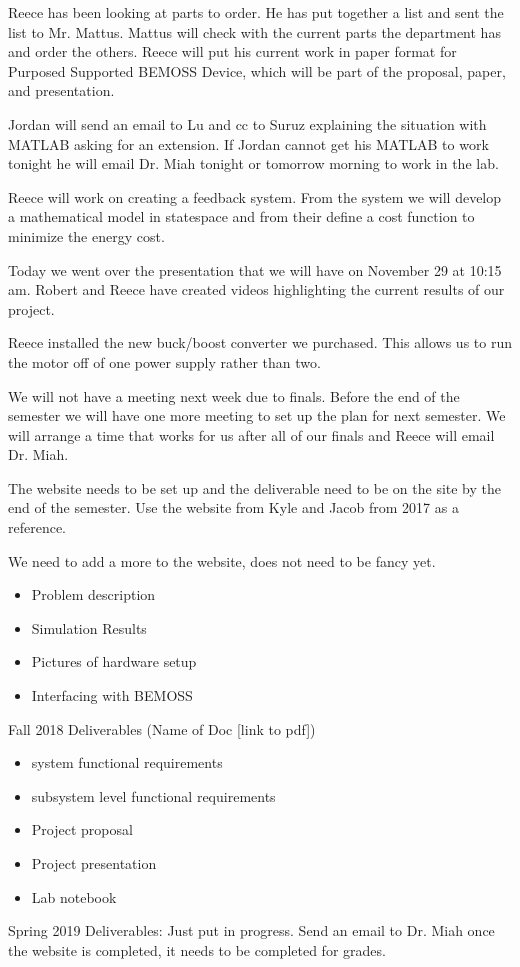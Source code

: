 \documentclass[fontsize=11pt, %
                             paper=letter, %
                             twoside, %
                             captions=tableheading,
                             index=totoc,
                             hyperref]{labbook}
\begin{document}
Reece has been looking at parts to order. He has put together a list and sent the list to Mr. Mattus. Mattus will check with the current parts the department has and order the others. Reece will put his current work in paper format for Purposed Supported BEMOSS Device, which will be part of the proposal, paper, and presentation.

Jordan will send an email to Lu and cc to Suruz explaining the situation with MATLAB asking for an extension. If Jordan cannot get his MATLAB to work tonight he will email Dr. Miah tonight or tomorrow morning to work in the lab.

Reece will work on creating a feedback system. From the system we will develop a mathematical model in statespace and from their define a cost function to minimize the energy cost.

Today we went over the presentation that we will have on November 29 at 10:15 am. Robert and Reece have created videos highlighting the current results of our project. 

Reece installed the new buck/boost converter we purchased. This allows us to run the motor off of one power supply rather than two.


We will not have a meeting next week due to finals. Before the end of the semester we will have one more meeting to set up the plan for next semester. We will arrange a time that works for us after all of our finals and Reece will email Dr. Miah. 

The website needs to be set up and the deliverable need to be on the site by the end of the semester. Use the website from Kyle and Jacob from 2017 as a reference.

We need to add a more to the website, does not need to be fancy yet.
\begin{itemize}
    \item Problem description
    \item Simulation Results
    \item Pictures of hardware setup
    \item Interfacing with BEMOSS
\end{itemize}

Fall 2018 Deliverables (Name of Doc [link to pdf])
\begin{itemize}
    \item system functional requirements
    \item subsystem level functional requirements
    \item Project proposal
    \item Project presentation
    \item Lab notebook
\end{itemize}
Spring 2019 Deliverables: Just put in progress.
Send an email to Dr. Miah once the website is completed, it needs to be completed for grades.
\end{document}
